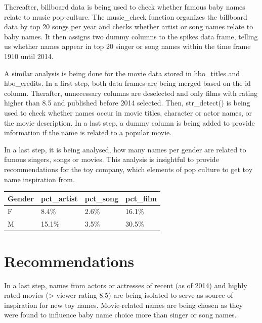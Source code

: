 \documentclass[11pt,preprint]{elsarticle}
\let\origtable\table
\let\endorigtable\endtable
\renewenvironment{table}[1][2] {
    \expandafter\origtable\expandafter[H]
} {
    \endorigtable
}
\numberwithin{equation}{section}
\numberwithin{figure}{section}
\numberwithin{table}{section}
\begin{document}
Thereafter, billboard data is being used to check whether famous baby
names relate to music pop-culture. The music\_check function organizes
the billboard data by top 20 songs per year and checks whether artist or
song names relate to baby names. It then assigns two dummy columns to
the spikes data frame, telling us whether names appear in top 20 singer
or song names within the time frame 1910 until 2014.

A similar analysis is being done for the movie data stored in
hbo\_titles and hbo\_credits. In a first step, both data frames are
being merged based on the id column. Therafter, unnecessary columns are
deselected and only films with rating higher than 8.5 and published
before 2014 selected. Then, str\_detect() is being used to check whether
names occur in movie titles, character or actor names, or the movie
description. In a last step, a dummy column is being added to provide
information if the name is related to a popular movie.

In a last step, it is being analysed, how many names per gender are
related to famous singers, songs or movies. This analysis is insightful
to provide recommendations for the toy company, which elements of pop
culture to get toy name inspiration from.

\begin{table}
\centering
\caption{\label{tab:spikes}Name Representation in Pop Culture}
\centering
\begin{tabular}[t]{l|l|l|l}
\hline
Gender & pct\_artist & pct\_song & pct\_film\\
\hline
F & 8.4\% & 2.6\% & 16.1\%\\
\hline
M & 15.1\% & 3.5\% & 30.5\%\\
\hline
\end{tabular}
\end{table}

\section{Recommendations}\label{recommendations}

In a last step, names from actors or actresses of recent (as of 2014)
and highly rated movies (\textgreater{} viewer rating 8.5) are being
isolated to serve as source of inspiration for new toy names.
Movie-related names are being chosen as they were found to influence
baby name choice more than singer or song names.
\end{document}
